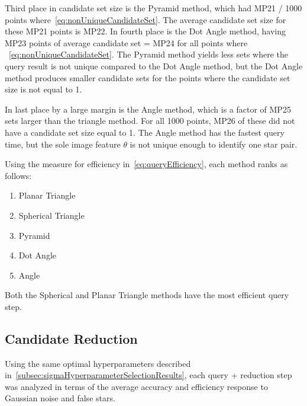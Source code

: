 Third place in candidate set size is the Pyramid method, which had MP21 / 1000 points
where~\autoref{eq:nonUniqueCandidateSet}.
The average candidate set size for these MP21 points is MP22.
In fourth place is the Dot Angle method, having MP23 points of average candidate set = MP24 for all points where
~\autoref{eq:nonUniqueCandidateSet}.
The Pyramid method yields less sets where the query result is not unique compared to the Dot Angle method, but the
Dot Angle method produces smaller candidate sets for the points where the candidate set size is not equal to 1.

In last place by a large margin is the Angle method, which is a factor of MP25 sets larger than the triangle method.
For all 1000 points, MP26 of these did not have a candidate set size equal to 1.
The Angle method has the fastest query time, but the sole image feature $\theta$ is not unique enough to identify one
star pair.

Using the measure for efficiency in~\autoref{eq:queryEfficiency}, each method ranks as follows:
\begin{multicols}{2}
    \begin{enumerate}
        \item Planar Triangle
        \item Spherical Triangle
        \item Pyramid
        \item Dot Angle
        \item Angle
    \end{enumerate}
\end{multicols}

Both the Spherical and Planar Triangle methods have the most efficient query step.

\subsection{Candidate Reduction}\label{subsec:candidateReductionResults}
Using the same optimal hyperparameters described in~\autoref{subsec:sigmaHyperparameterSelectionResults}, each query +
reduction step was analyzed in terms of the average accuracy and efficiency response to Gaussian noise and false stars.

